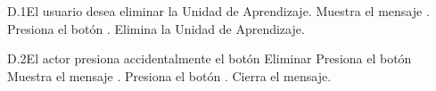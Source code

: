 
\begin{UCtrayectoriaA}{D.1}{El usuario desea eliminar la Unidad de Aprendizaje.}
	\UCpaso  Muestra el mensaje .
	\UCpaso[\UCactor] Presiona el botón .
	\UCpaso Elimina la Unidad de Aprendizaje.
\end{UCtrayectoriaA}



\begin{UCtrayectoriaA}{D.2}{El actor presiona accidentalmente el botón Eliminar}
	\UCpaso[\UCactor] Presiona el botón 
	\UCpaso Muestra el mensaje .
	\UCpaso[\UCactor] Presiona el botón .
	\UCpaso Cierra el mensaje.
	
\end{UCtrayectoriaA}

